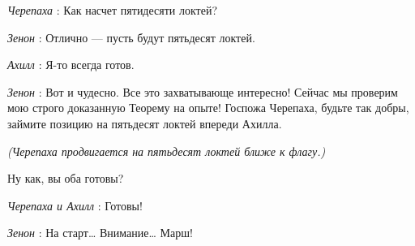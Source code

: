 \emph{Черепаха} : Как насчет пятидесяти локтей?

\emph{Зенон} : Отлично --- пусть будут пятьдесят локтей.

\emph{Ахилл} : Я-то всегда готов.

\emph{Зенон} : Вот и чудесно. Все это захватывающе интересно! Сейчас мы проверим мою строго доказанную Теорему на опыте! Госпожа Черепаха, будьте так добры, займите позицию на пятьдесят локтей впереди Ахилла.

\emph{(Черепаха продвигается на пятьдесят локтей ближе к флагу.)}

Ну как, вы оба готовы?

\emph{Черепаха и Ахилл} : Готовы!

\emph{Зенон} : На старт\ldots{} Внимание\ldots{} Марш!

